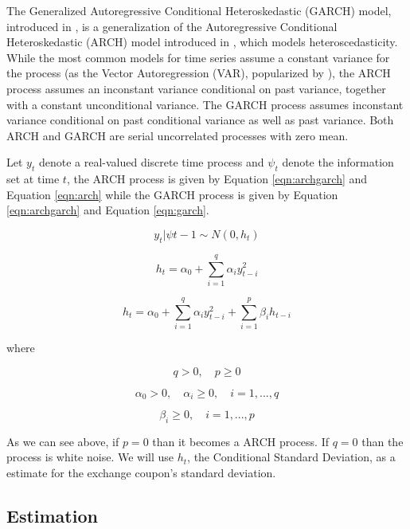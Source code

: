 \documentclass[cic,tc, english]{iiufrgs}
\begin{document}
    The Generalized Autoregressive Conditional Heteroskedastic (GARCH) model, introduced in \citet{bollerslev1986}, is a generalization of the Autoregressive Conditional Heteroskedastic (ARCH) model introduced in \citet{engle1982}, which models heteroscedasticity. While the most common models for time series assume a constant variance for the process (as the Vector Autoregression (VAR), popularized by \citet{var}), the ARCH process assumes an inconstant variance conditional on past variance, together with a constant unconditional variance. The GARCH process assumes inconstant variance conditional on past conditional variance as well as past variance. Both ARCH and GARCH are serial uncorrelated processes with zero mean.

    Let $y_t$ denote a real-valued discrete time process and $\psi_t$ denote the information set at time $t$, the ARCH process is given by Equation \ref{eqn:archgarch} and Equation \ref{eqn:arch} while the GARCH process is given by Equation \ref{eqn:archgarch} and Equation \ref{eqn:garch}.

    \begin{equation}
        \label{eqn:archgarch}
        y_t | \psi{t-1} \sim N(0,h_t)
    \end{equation}

    \begin{equation}
        \label{eqn:arch}
        h_t = \alpha_0 + \displaystyle\sum_{i=1}^{q} \alpha_i y_{t-i}^2
    \end{equation}

    \begin{equation}
        \label{eqn:garch}
        h_t = \alpha_0 + \displaystyle\sum_{i=1}^{q} \alpha_i y_{t-i}^2 + \displaystyle\sum_{i=1}^{p} \beta_i h_{t-i}
    \end{equation}

    where

    $$q > 0, \quad   p \geq 0$$

    $$\alpha_0 > 0, \quad  \alpha_i \geq 0, \quad  i=1,...,q$$

    $$\beta_i \geq 0, \quad  i=1,...,p$$

    As we can see above, if $p = 0$ than it becomes a ARCH process. If $q = 0$ than the process is white noise. We will use $h_t$, the Conditional Standard Deviation, as a estimate for the exchange coupon's standard deviation.

\subsection{Estimation} \label{chapter_estimation}
\end{document}
